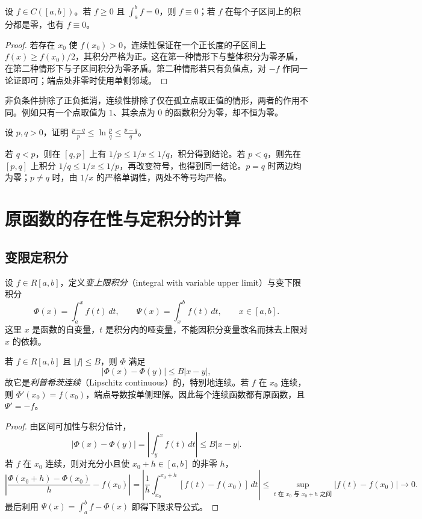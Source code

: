 \begin{proposition}
\label{prop:zero-integral-continuous-functions}
设 $f\in C([a,b])$。若 $f\geq0$ 且 $\int_a^b f=0$，则 $f\equiv0$；若 $f$ 在每个子区间上的积分都是零，也有 $f\equiv0$。
\end{proposition}
\begin{proof}
若存在 $x_0$ 使 $f(x_0)>0$，连续性保证在一个正长度的子区间上 $f(x)\geq f(x_0)/2$，其积分严格为正。这在第一种情形下与整体积分为零矛盾，在第二种情形下与子区间积分为零矛盾。第二种情形若只有负值点，对 $-f$ 作同一论证即可；端点处非零时使用单侧邻域。
\end{proof}

非负条件排除了正负抵消，连续性排除了仅在孤立点取正值的情形，两者的作用不同。例如只有一个点取值为 $1$、其余点为 $0$ 的函数积分为零，却不恒为零。

\begin{example}
\label{ex:logarithm-integral-inequality}
设 $p,q>0$，证明 $\displaystyle\frac{p-q}{p}\leq\ln\frac pq\leq\frac{p-q}{q}$。
\end{example}
\begin{solve}
若 $q<p$，则在 $[q,p]$ 上有 $1/p\leq1/x\leq1/q$，积分得到结论。若 $p<q$，则先在 $[p,q]$ 上积分 $1/q\leq1/x\leq1/p$，再改变符号，也得到同一结论。$p=q$ 时两边均为零；$p\neq q$ 时，由 $1/x$ 的严格单调性，两处不等号均严格。
\end{solve}

\section{原函数的存在性与定积分的计算}
\label{sec:antiderivative-existence-and-definite-integration}

\subsection{变限定积分}
\label{subsec:definite-integrals-with-variable-limits}

设 $f\in R[a,b]$，定义\emph{变上限积分}（integral with variable upper limit）与变下限积分
\[
    \Phi(x)=\int_a^x f(t)\,dt,\qquad
    \Psi(x)=\int_x^b f(t)\,dt,\qquad x\in[a,b].
\]
这里 $x$ 是函数的自变量，$t$ 是积分内的哑变量，不能因积分变量改名而抹去上限对 $x$ 的依赖。

\begin{theorem}[变限积分与原函数]
\label{thm:variable-integral-and-antiderivative}
若 $f\in R[a,b]$ 且 $|f|\leq B$，则 $\Phi$ 满足
\[
    |\Phi(x)-\Phi(y)|\leq B|x-y|,
\]
故它是\emph{利普希茨连续}（Lipschitz continuous）的，特别地连续。若 $f$ 在 $x_0$ 连续，则 $\Phi'(x_0)=f(x_0)$，端点导数按单侧理解。因此每个连续函数都有原函数，且 $\Psi'=-f$。
\end{theorem}
\begin{proof}
由区间可加性与积分估计，
\[
    |\Phi(x)-\Phi(y)|=\left|\int_y^x f(t)\,dt\right|\leq B|x-y|.
\]
若 $f$ 在 $x_0$ 连续，则对充分小且使 $x_0+h\in[a,b]$ 的非零 $h$，
\[
    \left|\frac{\Phi(x_0+h)-\Phi(x_0)}h-f(x_0)\right|
    =\left|\frac1h\int_{x_0}^{x_0+h}[f(t)-f(x_0)]\,dt\right|
    \leq\sup_{t\text{ 在 }x_0\text{ 与 }x_0+h\text{ 之间}}|f(t)-f(x_0)|
    \longrightarrow0.
\]
最后利用 $\Psi(x)=\int_a^b f-\Phi(x)$ 即得下限求导公式。
\end{proof}

